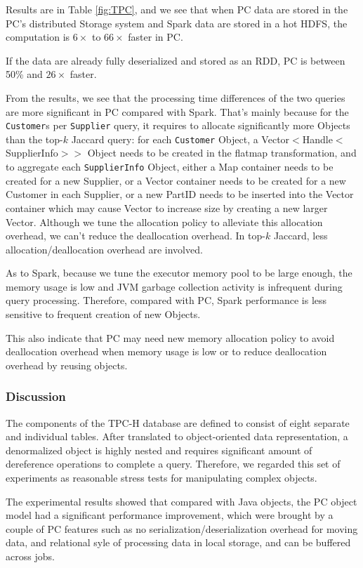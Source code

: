 Results are in Table \ref{fig:TPC},  and we see that when PC data are
stored in the PC's distributed Storage system and Spark data
are stored in
a hot HDFS, the computation is $6\times$ to $66\times$ faster in PC.  

If the data are already
fully deserialized and stored as an RDD, PC is 
between 50\% and $26\times$ faster.

From the results, we see that the processing time differences of the
two queries are more significant in PC compared with Spark. That's
mainly because for the \texttt{Customer}s per \texttt{Supplier} query,
it requires to allocate significantly more Objects than the top-$k$
Jaccard query: for each \texttt{Customer} Object, a
Vector$<$Handle$<$SupplierInfo$>$$>$ Object needs to be created in the
flatmap transformation, and to aggregate each \texttt{SupplierInfo}
Object, either a Map container needs to be created for a new Supplier,
or a Vector container needs to be created for a new Customer in each
Supplier, or a new PartID needs to be inserted into the Vector
container which may cause Vector to increase size by creating a new
larger Vector. Although we tune the allocation policy to alleviate
this allocation overhead, we can't reduce the deallocation
overhead. In top-$k$ Jaccard, less allocation/deallocation overhead
are involved.

As to Spark, because we tune the executor memory pool to be large
enough, the memory usage is low and JVM garbage collection activity is infrequent during query
processing. 
Therefore, compared with PC, Spark performance is less
sensitive to frequent creation of new Objects. 

This also indicate that PC may need new memory allocation policy to
avoid deallocation overhead when memory usage is low or to reduce
deallocation overhead by reusing objects.


\subsubsection{Discussion} 
The components of the TPC-H database are defined to
consist of eight separate and individual tables. After translated to
object-oriented data representation, a denormalized object is highly
nested and requires significant amount of dereference
operations to complete a query. Therefore, we regarded this set of
experiments as reasonable stress
tests for manipulating complex objects. 

The experimental results showed that
compared with Java objects, the PC
object model had a significant performance improvement, which were
brought by a couple of PC features such
as no serialization/deserialization overhead for moving data, and
relational syle of processing data in local storage, and can be
buffered across jobs.

